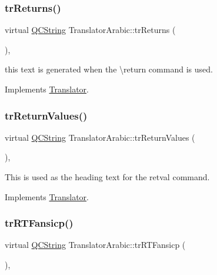 \subsubsection{\texorpdfstring{trReturns()}{trReturns()}}
{\footnotesize\ttfamily virtual \mbox{\hyperlink{class_q_c_string}{Q\+C\+String}} Translator\+Arabic\+::tr\+Returns (\begin{DoxyParamCaption}{ }\end{DoxyParamCaption})\hspace{0.3cm}{\ttfamily [inline]}, {\ttfamily [virtual]}}

this text is generated when the \textbackslash{}return command is used. 

Implements \mbox{\hyperlink{class_translator}{Translator}}.

\mbox{\label{class_translator_arabic_adfcbf3e24fe5eaedd86fbfddbdcb7e42}} 
\subsubsection{\texorpdfstring{trReturnValues()}{trReturnValues()}}
{\footnotesize\ttfamily virtual \mbox{\hyperlink{class_q_c_string}{Q\+C\+String}} Translator\+Arabic\+::tr\+Return\+Values (\begin{DoxyParamCaption}{ }\end{DoxyParamCaption})\hspace{0.3cm}{\ttfamily [inline]}, {\ttfamily [virtual]}}

This is used as the heading text for the retval command. 

Implements \mbox{\hyperlink{class_translator}{Translator}}.

\mbox{\label{class_translator_arabic_aa85b5114f22f96945211a76b143bc067}} 
\subsubsection{\texorpdfstring{trRTFansicp()}{trRTFansicp()}}
{\footnotesize\ttfamily virtual \mbox{\hyperlink{class_q_c_string}{Q\+C\+String}} Translator\+Arabic\+::tr\+R\+T\+Fansicp (\begin{DoxyParamCaption}{ }\end{DoxyParamCaption})\hspace{0.3cm}{\ttfamily [inline]}, {\ttfamily [virtual]}}

